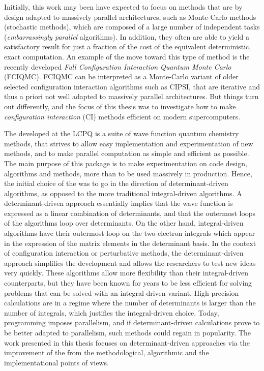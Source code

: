 \documentclass[12pt,a4paper]{report}
\begin{document}
Initially, this work may been have expected to focus on methods that are by
design adapted to massively parallel architectures, such as Monte-Carlo methods
(stochastic methods), which are composed of a large number of independent tasks
(\emph{embarrassingly parallel} algorithms). In addition, they often are able
to yield a satisfactory result for just a fraction of the cost of the
equivalent deterministic, exact computation. An example of the move toward this
type of method is the recently developed \emph{Full Configuration Interaction
Quantum Monte Carlo} (FCIQMC).\cite{Booth_2009} FCIQMC can be interpreted as a
Monte-Carlo variant of older selected configuration interaction algorithms such as
CIPSI,\cite{Huron_1973} that are iterative and thus a priori not well adapted to
massively parallel architectures. But things turn out differently, and the
focus of this thesis was to investigate how to make \emph{configuration
interaction} (CI) methods efficient on modern supercomputers.

The \QP\cite{QP} developed at the LCPQ is a suite of wave function quantum
chemistry methods, that strives to allow easy implementation and
experimentation of new methods, and to make parallel computation
as simple and efficient as possible. The main purpose of this package
is to make experimentation on code design, algorithms and methods,
more than to be used massively in production.
Hence, the initial choice of the \QP was to go in the direction of
determinant-driven algorithms, as opposed to the more traditional
integral-driven algorithms.
A determinant-driven approach essentially implies that the wave function
is expressed as a linear combination of determinants, and that the 
outermost loops of the algorithms loop over determinants.
On the other hand, integral-driven algorithms have their outermost loop
on the two-electron integrals which appear in the expression of the matrix
elements in the determinant basis.
In the context of configuration interaction or perturbative
methods, the determinant-driven approach simplifies the development and allows
the researchers to test new ideas very quickly. These algorithms allow more
flexibility than their integral-driven
counterparts,\cite{Povill_1995} but they have been known for years to
be less efficient for solving problems that can be solved with an
integral-driven variant. High-precision calculations are in a regime
where the number of determinants is larger than the number of integrals,
which justifies the integral-driven choice.  Today, programming imposes
parallelism, and if
determinant-driven calculations prove to be better adapted to parallelism, such
methods could regain in popularity. The work presented in this thesis focuses
on determinant-driven approaches via the improvement of the \QP from
the methodological, algorithmic and the implementational points of views.
\end{document}
